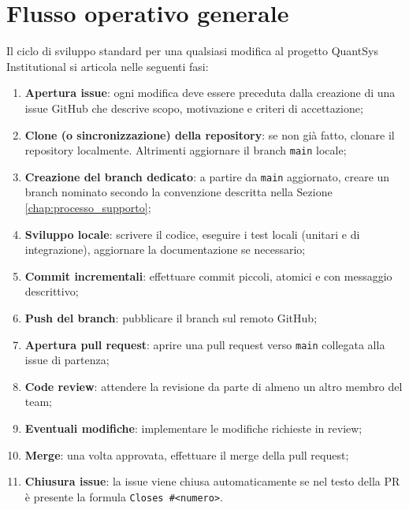\section{Flusso operativo generale}

Il ciclo di sviluppo standard per una qualsiasi modifica al progetto QuantSys Institutional si articola nelle seguenti fasi:

\begin{enumerate}
  \item \textbf{Apertura issue}: ogni modifica deve essere preceduta dalla creazione di una issue GitHub che descrive scopo, motivazione e criteri di accettazione;
  \item \textbf{Clone (o sincronizzazione) della repository}: se non già fatto, clonare il repository localmente. Altrimenti aggiornare il branch \texttt{main} locale;
  \item \textbf{Creazione del branch dedicato}: a partire da \texttt{main} aggiornato, creare un branch nominato secondo la convenzione descritta nella Sezione \ref{chap:processo_supporto};
  \item \textbf{Sviluppo locale}: scrivere il codice, eseguire i test locali (unitari e di integrazione), aggiornare la documentazione se necessario;
  \item \textbf{Commit incrementali}: effettuare commit piccoli, atomici e con messaggio descrittivo;
  \item \textbf{Push del branch}: pubblicare il branch sul remoto GitHub;
  \item \textbf{Apertura pull request}: aprire una pull request verso \texttt{main} collegata alla issue di partenza;
  \item \textbf{Code review}: attendere la revisione da parte di almeno un altro membro del team;
  \item \textbf{Eventuali modifiche}: implementare le modifiche richieste in review;
  \item \textbf{Merge}: una volta approvata, effettuare il merge della pull request;
  \item \textbf{Chiusura issue}: la issue viene chiusa automaticamente se nel testo della PR è presente la formula \texttt{Closes \#<numero>}.
\end{enumerate}
